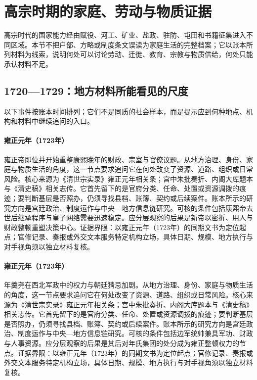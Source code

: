 \section{高宗时期的家庭、劳动与物质证据}
高宗时代的国家能力经由赋役、河工、矿业、盐政、驻防、屯田和书籍征集进入不同区域。本节不把户部、方略或制度条文误读为家庭生活的完整档案；它以账本所列材料为线索，说明何处可以讨论劳动、迁徙、教育、宗教与物质供给，何处只能承认材料不足。
\subsection{1720—1729：地方材料所能看见的尺度}
以下事件按账本时间排列；它们不是同质的社会样本，而是提示应到何种地点、机构和材料中继续追问的入口。
\hypertarget{social:EQ-1723-YONGZHENG-ACCESSION}{}\paragraph{雍正元年（1723年）}雍正帝即位并开始重整康熙晚年的财政、宗室与官僚议题。从地方治理、身份、家庭与物质生活的角度，这一节点要求追问它在何处改变了资源、道路、组织或日常风险。核心来源为《清世宗实录》雍正元年相关条；宫中朱批奏折、内阁大库题本与《清史稿》相关志传。它首先留下的是官府分类、任命、处置或资源调拨的痕迹；要判断基层是否照办，仍须寻找县档、账簿、契约或后续案件。账本所示的研究方向是宫廷政治、制度运作与中央—地方信息链研究。可核的条件包括康熙帝去世后继承程序与皇子网络需要迅速稳定。应分层观察的后果是新帝以密折、用人与财政整顿重塑决策中心。证据界限：以雍正元年（1723年）的同期文书为定位起点；官修记录、奏报或外交文本服务特定机构立场，具体日期、规模、地方执行与对手视角须以独立材料复核。
\hypertarget{social:EQ-1723-JI-ZENGYUN-CASE}{}\paragraph{雍正元年（1723年）}年羹尧在西北军政中的权力与朝廷猜忌加剧。从地方治理、身份、家庭与物质生活的角度，这一节点要求追问它在何处改变了资源、道路、组织或日常风险。核心来源为《清世宗实录》雍正元年相关条；宫中朱批奏折、内阁大库题本与《清史稿》相关志传。它首先留下的是官府分类、任命、处置或资源调拨的痕迹；要判断基层是否照办，仍须寻找县档、账簿、契约或后续案件。账本所示的研究方向是宫廷政治、制度运作与中央—地方信息链研究。可核的条件包括边军统帅兼具军功、财政与人事资源。应分层观察的后果是其后对年氏集团的处分成为雍正整顿权力的节点。证据界限：以雍正元年（1723年）的同期文书为定位起点；官修记录、奏报或外交文本服务特定机构立场，具体日期、规模、地方执行与对手视角须以独立材料复核。
